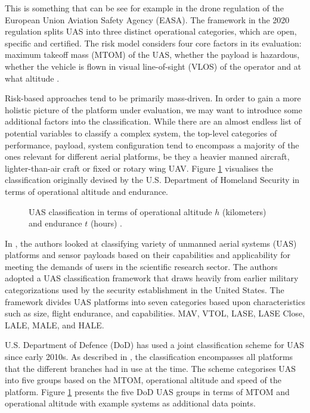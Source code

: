 \documentclass[english, 12pt, a4paper, elec, utf8, a-1b, online]{aaltothesis}
\begin{document}
This is something that can be see for example in the drone regulation of the European Union Aviation Safety Agency (EASA).
The framework in the 2020 regulation splits UAS into three distinct operational categories, which are open, specific and certified.
The risk model considers four core factors in its evaluation: maximum takeoff mass (MTOM) of the UAS, whether the payload is hazardous, whether the vehicle is flown in visual line-of-sight (VLOS) of the operator and at what altitude \cite{alamouri2021exploratory}.

Risk-based approaches tend to be primarily mass-driven. In order to gain a more holistic picture of the platform under evaluation, we may want to introduce some additional factors into the classification.
While there are an almost endless list of potential variables to classify a complex system, the top-level categories of performance, payload, system configuration tend to encompass a majority of the ones relevant for different aerial platforms, be they a heavier manned aircraft, lighter-than-air craft or fixed or rotary wing UAV. Figure \ref{fig-3d-dhs-uas-classification} visualises the classification originally devised by the U.S. Department of Homeland Security in terms of operational altitude and endurance.

\begin{figure}[h]
  \centering
  
  \caption{UAS classification in terms of operational altitude $h$ (kilometers) and endurance $t$ (hours) \cite{watts2012unmanned}.}
  \label{fig-3d-dhs-uas-classification}
\end{figure}

In \cite{watts2012unmanned}, the authors looked at classifying variety of unmanned aerial systems (UAS) platforms and sensor payloads based on their capabilities and applicability for meeting the demands of users in the scientific research sector. The authors adopted a UAS classification framework that draws heavily from earlier military categorizations used by the security establishment in the United States. The framework divides UAS platforms into seven categories based upon characteristics such as size, flight endurance, and capabilities. MAV, VTOL, LASE, LASE Close, LALE, MALE, and HALE.

U.S. Department of Defence (DoD) has used a joint classification scheme for UAS since early 2010s. As described in \cite{jp3-30}, the classification encompasses all platforms that the different branches had in use at the time. The scheme categorises UAS into five groups based on the MTOM, operational altitude and speed of the platform. Figure \ref{fig-3d-dhs-uas-classification} presents the five DoD UAS groups in terms of MTOM and operational altitude with example systems as additional data points.
\end{document}
